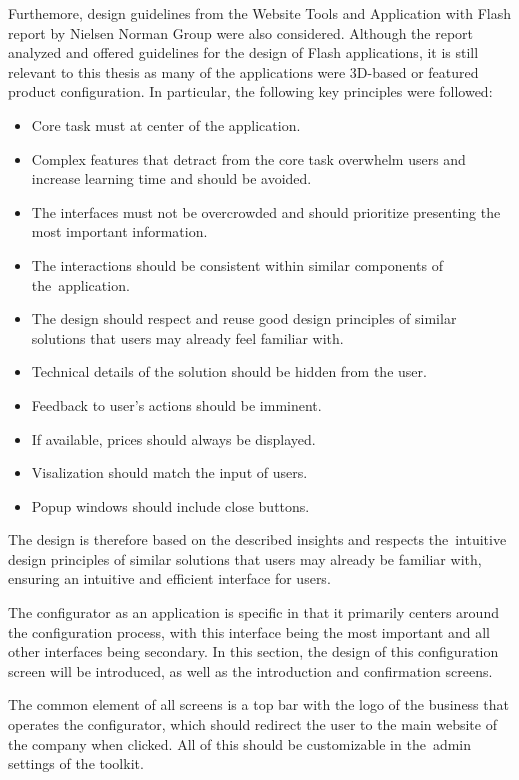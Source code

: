 Furthemore, design guidelines from the Website Tools and Application with Flash report by Nielsen Norman Group \cite{Nielsen2013} were also considered. Although the report analyzed and offered guidelines for the design of Flash applications, it is still relevant to this thesis as many of the applications were 3D-based or featured product configuration. In particular, the following key principles were followed:
\begin{itemize}[label=\rectanglebullet]
    \item Core task must at center of the application.
    \item Complex features that detract from the core task overwhelm users and increase learning time and should be avoided.
    \item The interfaces must not be overcrowded and should prioritize presenting the most important information.
    \item The interactions should be consistent within similar components of the~application.
    \item The design should respect and reuse good design principles of similar solutions that users may already feel familiar with.
    \item Technical details of the solution should be hidden from the user.
    \item Feedback to user's actions should be imminent.
    \item If available, prices should always be displayed.
    \item Visalization should match the input of users.
    \item Popup windows should include close buttons.
\end{itemize}

The design is therefore based on the described insights and respects the~intuitive design principles of similar solutions that users may already be familiar with, ensuring an intuitive and efficient interface for users.

The configurator as an application is specific in that it primarily centers around the configuration process, with this interface being the most important and all other interfaces being secondary. In this section, the design of this configuration screen will be introduced, as well as the introduction and confirmation screens.

The common element of all screens is a top bar with the logo of the business that operates the configurator, which should redirect the user to the main website of the company when clicked. All of this should be customizable in the~admin settings of the toolkit.

